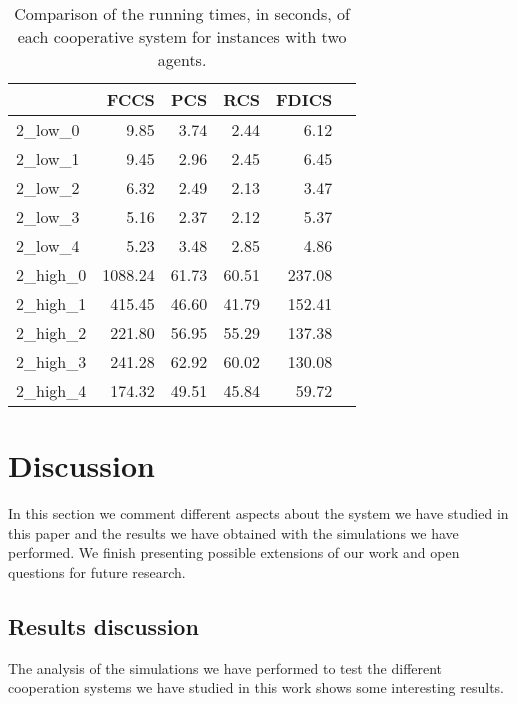 \documentclass{article}
\begin{document}
\begin{table}[ht!]
\centering
\caption{Comparison of the running times, in seconds, of each cooperative system for instances with two agents.\label{tb:2_times}}
\begin{tabular}{lrrrrr}
\toprule
{} &     FCCS &  PCS &  RCS &  FDICS \\
\midrule
2\_low\_0  &               9.85 &     3.74 &      2.44 &       6.12 \\
2\_low\_1  &                 9.45 &     2.96 &      2.45 &       6.45 \\
2\_low\_2  &                6.32 &     2.49 &      2.13 &       3.47 \\
2\_low\_3  &                 5.16 &     2.37 &      2.12 &       5.37 \\
2\_low\_4  &                 5.23 &     3.48 &      2.85 &       4.86 \\
2\_high\_0 &             1088.24 &    61.73 &     60.51 &     237.08 \\
2\_high\_1 &              415.45 &    46.60 &     41.79 &     152.41 \\
2\_high\_2 &              221.80 &    56.95 &     55.29 &     137.38 \\
2\_high\_3 &              241.28 &    62.92 &     60.02 &     130.08 \\
2\_high\_4 &              174.32 &    49.51 &     45.84 &      59.72 \\
\bottomrule
\end{tabular}
\end{table}





\section{Discussion} \label{seq:discussion}

In this section we comment different aspects about the system we have studied in this paper and the results we have obtained with the simulations we have performed. We finish presenting possible extensions of our work and open questions for future research.

\subsection{Results discussion}

The analysis of the simulations we have performed to test the different cooperation systems we have studied in this work shows some interesting results.
\end{document}
